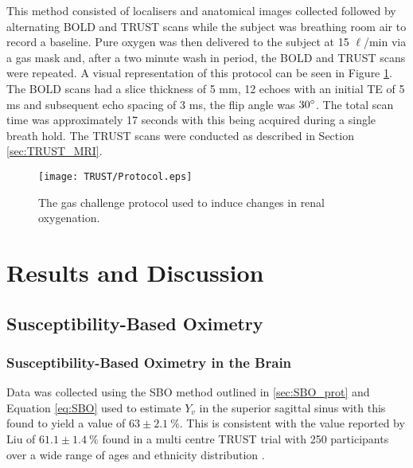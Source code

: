 This method consisted of localisers and anatomical images collected followed by alternating \ac{BOLD} \ttwostar and \ac{TRUST} scans while the subject was breathing room air to record a baseline. Pure oxygen was then delivered to the subject at 15 $\ell$/min via a gas mask and, after a two minute wash in period, the \ac{BOLD} \ttwostar and \ac{TRUST} scans were repeated. A visual representation of this protocol can be seen in Figure \ref{fig:oxygen_challenge_protocol}. The \ac{BOLD} \ttwostar scans had a slice thickness of 5 mm, 12 echoes with an initial \ac{TE} of 5 ms and subsequent echo spacing of 3 ms, the flip angle was $30\degree$. The total scan time was approximately 17 seconds with this being acquired during a single breath hold. The \ac{TRUST} scans were conducted as described in Section \ref{sec:TRUST_MRI}.

\begin{figure}[H]
	\centering
	\texttt{[image: TRUST/Protocol.eps]}
	\caption{The gas challenge protocol used to induce changes in renal oxygenation.}
	\label{fig:oxygen_challenge_protocol}	
\end{figure}

\newpage
\section{Results and Discussion}
\subsection{Susceptibility-Based Oximetry}
\subsubsection{Susceptibility-Based Oximetry in the Brain}

Data was collected using the \ac{SBO} method outlined in \ref{sec:SBO_prot} and Equation \eqref{eq:SBO} used to estimate $Y_v$ in the superior sagittal sinus with this found to yield a value of $63\pm2.1~\%$. This is consistent with the value reported by Liu of $61.1\pm1.4~\%$ found in a multi centre \ac{TRUST} trial with 250 participants over a wide range of ages and ethnicity distribution \cite{liu_multi-site_2016}.


